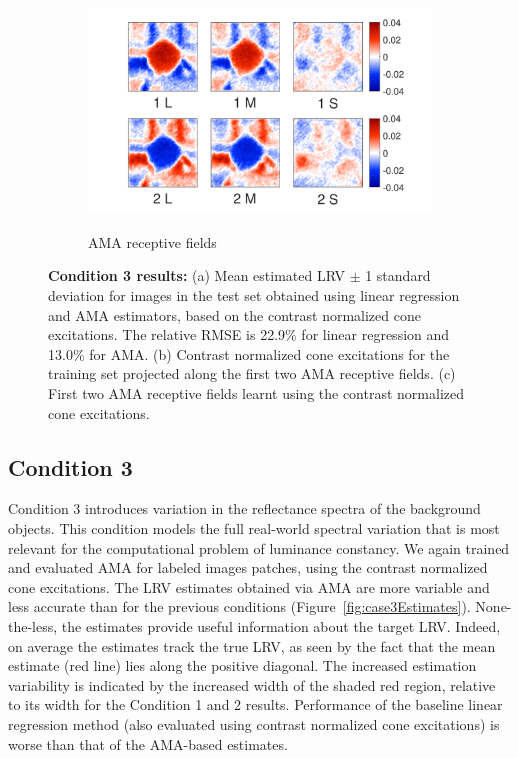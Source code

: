 \documentclass{jov}
\begin{document}
\begin{figure}
\begin{subfigure}[b]{0.26\textwidth}
        \label{fig:case3RFResponse}
    \end{subfigure}
    \begin{subfigure}[b]{0.4 \textwidth}
	\caption{AMA receptive fields}
	\includegraphics[width=1.0\textwidth, trim={0.2cm -0.cm 0 0.3cm}]{../FiguresDraft4/Figure12/Figure12_c.pdf}
	\label{fig:case3RFs}
    \end{subfigure}
    \caption{{\bf Condition 3 results:} (a) Mean estimated LRV $\pm$ 1 standard deviation for images in the test set obtained using linear regression and AMA estimators, based on the contrast normalized cone excitations. The relative RMSE is 22.9\%  for linear regression and 13.0\% for AMA. (b) Contrast normalized cone excitations for the training set projected along the first two AMA receptive fields. (c) First two AMA receptive fields learnt using the contrast normalized cone excitations.}
\label{fig:Condition3}
\end{figure}

\subsection{Condition 3}

Condition 3 introduces variation in the reflectance spectra of the background objects.
This condition models the full real-world spectral variation that is most relevant for the computational problem of luminance constancy.
We again trained and evaluated AMA for labeled images patches, using the contrast normalized cone excitations.
The LRV estimates obtained via AMA are more variable and less accurate than for the previous conditions (Figure~\ref{fig:case3Estimates}).
None-the-less, the estimates provide useful information about the target LRV.
Indeed, on average the estimates track the true LRV, as seen by the fact that the mean estimate
(red line) lies along the positive diagonal.
The increased estimation variability is indicated by the increased width of the shaded red region, relative to its width for the Condition 1 and 2 results.
Performance of the baseline linear regression method (also evaluated using contrast normalized cone excitations) is worse than that of the AMA-based estimates.
\end{document}
